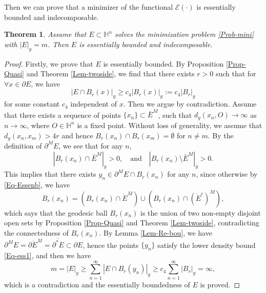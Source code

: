 \documentclass[11pt,reqno]{amsart}
\newtheorem{thm}{Theorem}[section]
\theoremstyle{definition}
\theoremstyle{remark}
\numberwithin{equation}{section}
\renewcommand{\(}{\left(}
\renewcommand{\)}{\right)}
\renewcommand{\-}{\overline}
\begin{document}
Then we can prove that a minimizer of the functional $\mathcal{E}(\cdot)$ is essentially bounded and indecomposable.
\begin{thm}\label{Thm-EI}
	Assume that $E\subset\mathbb{H}^n$ solves the minimization problem \eqref{Prob-mini} with $|E|_g=m$. Then $E$ is essentially bounded and indecomposable.
\end{thm}
\begin{proof}
	Firstly, we prove that $E$ is essentially bounded. By Proposition \ref{Prop-Quasi} and Theorem \ref{Lem-twoside}, we find that there exists $r>0$ such that for $\forall x\in\partial E$, we have 
	\begin{equation}\label{Eq-ess1}
	|E\cap B_r(x)|_g\geq c_4 |B_r(x)|_g:=c_4 |B_r|_g
	\end{equation}
	for some constant $c_4$ independent of $x$. Then we argue by contradiction. Assume that there exists a sequence of points $\{x_n\}\subset\bar{E}^M$, such that $d_g(x_n,O)\to\infty$ as $n\to\infty$, where $O\in\mathbb{H}^n$ is a fixed point. Without loss of generality, we assume that $d_g(x_n,x_m)>4r$ and hence $B_r(x_n)\cap B_r(x_m)=\emptyset$ for $n\neq m$. By the definition of $\partial^M E$, we see that for any $n$, 
	\begin{equation}\label{Eq-ess2}
	  	|B_r(x_n)\cap \bar{E}^M|_g>0,\quad \text{and}\quad	|B_r(x_n)\setminus \bar{E}^M|_g>0.
	\end{equation}
	This implies that there exists $y_n\in\partial^M E\cap B_r(x_n)$ for any $n$, since otherwise by \eqref{Eq-Essenb}, we have
	\begin{equation*}
		B_r(x_n)=\left(B_r(x_n)\cap\mathring{E}^M\right)\cup \left(B_r(x_n)\cap(\mathring{E}^c)^M\right),
	\end{equation*}
	which says that the geodesic ball $B_r(x_n)$ is the union of two non-empty disjoint open sets by Proposition \ref{Prop-Quasi} and Theorem \ref{Lem-twoside}, contradicting the connectedness of $B_r(x_n)$. By Lemma \ref{Lem-Re-bou}, we have $\partial^M E=\partial \mathring{E}^M=\overline{\partial^{*}E}\subset\partial E$, hence the points $\{y_n\}$ satisfy the lower density bound \eqref{Eq-ess1}, and then we have
	\begin{equation*}
		m=|E|_g\geq\sum_{n=1}^{\infty}|E\cap B_r(y_n)|_g\geq c_4\sum_{n=1}^{\infty}|B_r|_g=\infty,
	\end{equation*}
	which is a contradiction and the essentially boundedness of $E$ is proved.
	

\end{proof}
\end{document}
